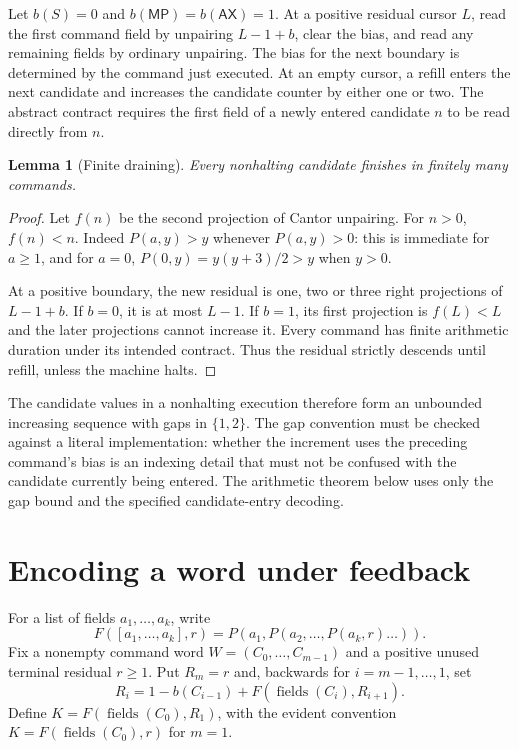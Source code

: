 \documentclass[11pt]{article}
\newcommand{\MP}{\mathsf{MP}}
\newcommand{\AX}{\mathsf{AX}}
\newtheorem{lemma}[theorem]{Lemma}
\begin{document}
Let $b(S)=0$ and $b(\MP)=b(\AX)=1$. At a positive residual cursor $L$, read the first command field by unpairing $L-1+b$, clear the bias, and read any remaining fields by ordinary unpairing. The bias for the next boundary is determined by the command just executed. At an empty cursor, a refill enters the next candidate and increases the candidate counter by either one or two. The abstract contract requires the first field of a newly entered candidate $n$ to be read directly from $n$.

\begin{lemma}[Finite draining]
Every nonhalting candidate finishes in finitely many commands.
\end{lemma}
\begin{proof}
Let $f(n)$ be the second projection of Cantor unpairing. For $n>0$, $f(n)<n$. Indeed $P(a,y)>y$ whenever $P(a,y)>0$: this is immediate for $a\ge1$, and for $a=0$, $P(0,y)=y(y+3)/2>y$ when $y>0$.

At a positive boundary, the new residual is one, two or three right projections of $L-1+b$. If $b=0$, it is at most $L-1$. If $b=1$, its first projection is $f(L)<L$ and the later projections cannot increase it. Every command has finite arithmetic duration under its intended contract. Thus the residual strictly descends until refill, unless the machine halts.
\end{proof}

The candidate values in a nonhalting execution therefore form an unbounded increasing sequence with gaps in $\{1,2\}$. The gap convention must be checked against a literal implementation: whether the increment uses the preceding command's bias is an indexing detail that must not be confused with the candidate currently being entered. The arithmetic theorem below uses only the gap bound and the specified candidate-entry decoding.

\section{Encoding a word under feedback}
For a list of fields $a_1,\ldots,a_k$, write
\[
 F([a_1,\ldots,a_k],r)=P(a_1,P(a_2,\ldots,P(a_k,r)\ldots)).
\]
Fix a nonempty command word $W=(C_0,\ldots,C_{m-1})$ and a positive unused terminal residual $r\ge1$. Put $R_m=r$ and, backwards for $i=m-1,\ldots,1$, set
\[
 R_i=1-b(C_{i-1})+F(\operatorname{fields}(C_i),R_{i+1}).
\]
Define $K=F(\operatorname{fields}(C_0),R_1)$, with the evident convention $K=F(\operatorname{fields}(C_0),r)$ for $m=1$.
\end{document}
